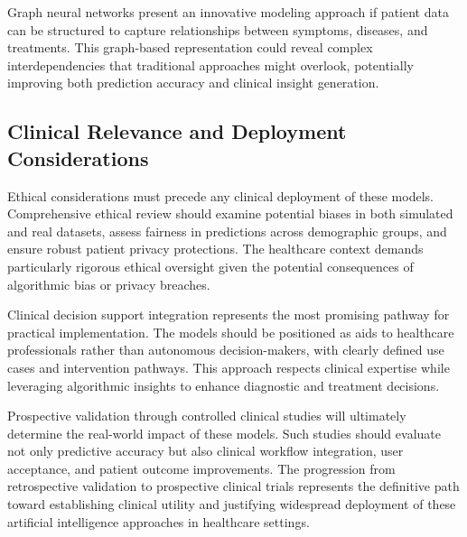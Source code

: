 Graph neural networks present an innovative modeling approach if patient data can be structured to capture relationships between symptoms, diseases, and treatments. This graph-based representation could reveal complex interdependencies that traditional approaches might overlook, potentially improving both prediction accuracy and clinical insight generation.

\subsection{Clinical Relevance and Deployment Considerations}

Ethical considerations must precede any clinical deployment of these models. Comprehensive ethical review should examine potential biases in both simulated and real datasets, assess fairness in predictions across demographic groups, and ensure robust patient privacy protections. The healthcare context demands particularly rigorous ethical oversight given the potential consequences of algorithmic bias or privacy breaches.

Clinical decision support integration represents the most promising pathway for practical implementation. The models should be positioned as aids to healthcare professionals rather than autonomous decision-makers, with clearly defined use cases and intervention pathways. This approach respects clinical expertise while leveraging algorithmic insights to enhance diagnostic and treatment decisions.

Prospective validation through controlled clinical studies will ultimately determine the real-world impact of these models. Such studies should evaluate not only predictive accuracy but also clinical workflow integration, user acceptance, and patient outcome improvements. The progression from retrospective validation to prospective clinical trials represents the definitive path toward establishing clinical utility and justifying widespread deployment of these artificial intelligence approaches in healthcare settings.